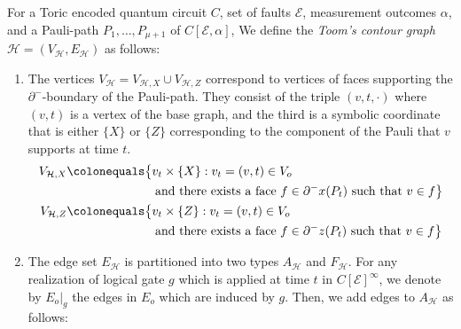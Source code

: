 \begin{definition}
    \label{def:contour}
    For a Toric encoded quantum circuit $C$, set of faults $\mathcal{E}$, measurement outcomes $\alpha$, and a Pauli-path $P_{1}, \ldots, P_{\mu +1}$ of $C[\mathcal{E}, \alpha]$, We define the \textit{Toom's contour graph} $\mathcal{H} = (V_{\mathcal{H}}, E_{\mathcal{H}})$ as follows: 
    \begin{enumerate}
      \item The vertices $V_{\mathcal{H}} = V_{\mathcal{H}, X} \cup V_{\mathcal{H}, Z}$ correspond to vertices of faces supporting the $\partial^{-}$-boundary of the Pauli-path. They consist of the triple $(v,t,\cdot)$ where $(v,t)$ is a vertex of the base graph, and the third is a symbolic coordinate that is either $\{X\}$ or $\{Z\}$ corresponding to the component of the Pauli that $v$ supports at time $t$.
        \begin{equation*}
          \begin{split}
            V_{\mathcal{H}, X} \colonequals & \big\{ v_{t} \times \{X\} : v_{t}=(v,t) \in V_{o} \\
            & \, \, \, \text{ and there exists a face } f \in \partial^{-} x(P_{t}) \text{ such that } v \in f \big\} \\
             V_{\mathcal{H}, Z} \colonequals & \big\{ v_{t} \times \{Z\} : v_{t}=(v,t) \in V_{o} \\
             & \, \, \, \text{ and there exists a face } f \in \partial^{-} z(P_{t}) \text{ such that } v \in f \big\} 
          \end{split}
        \end{equation*}


      \item The edge set $E_{\mathcal{H}}$ is partitioned into two types $A_{\mathcal{H}}$ and $F_{\mathcal{H}}$. For any realization of logical gate $g$ which is applied at time $t$ in $C[\mathcal{E}]^{\infty} $, we denote by $E_{o}|_{g}$ the edges in $E_{o}$ which are induced by $g$. Then, we add edges to $A_{\mathcal{H}}$ as follows: 


\end{enumerate}
\end{definition}
